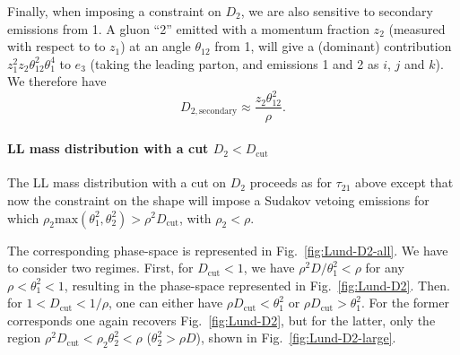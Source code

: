 Finally, when imposing a constraint on $D_2$, we are also sensitive to
secondary emissions from 1. A gluon ``2'' emitted with a momentum
fraction $z_2$ (measured with respect to to $z_1$) at an angle $\theta_{12}$ from
1, will give a (dominant) contribution $z_1^2z_2\theta_{12}^2\theta_1^4$
to $e_3$ (taking the leading parton, and emissions 1 and 2 as $i$, $j$
and $k$). We therefore have
\begin{equation}
  D_{2,\text{secondary}} \approx \frac{z_2\theta_{12}^2}{\rho}.
\end{equation}

\paragraph{LL mass distribution with a cut $D_2<D_\text{cut}$}
%
The LL mass distribution with a cut on $D_2$ proceeds as for
$\tau_{21}$ above except that now the constraint on the shape will
impose a Sudakov vetoing emissions for which
$\rho_2 \text{max}(\theta_1^2,\theta_2^2)>\rho^2D_\text{cut}$, with
$\rho_2<\rho$.

The corresponding phase-space is represented in
Fig.~\ref{fig:Lund-D2-all}.
%
We have to consider two regimes. First, for $D_\text{cut}<1$, we have
$\rho^2D/\theta_1^2<\rho$ for any $\rho<\theta_1^2<1$, resulting in
the phase-space represented in Fig.~\ref{fig:Lund-D2}. Then. for
$1<D_\text{cut}<1/\rho$, one can either have $\rho
D_\text{cut}<\theta_1^2$ or $\rho
D_\text{cut}>\theta_1^2$. For the former corresponds one again recovers
Fig.~\ref{fig:Lund-D2}, but for the latter, only the region
$\rho^2D_\text{cut}<\rho_2\theta_2^2<\rho$ (\ie $\theta_2^2>\rho D$),
shown in Fig.~\ref{fig:Lund-D2-large}.

